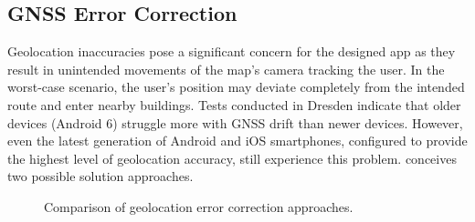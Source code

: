 \subsection{GNSS Error Correction}

Geolocation inaccuracies pose a significant concern for the designed app as they result in unintended movements of the map's camera tracking the user. In the worst-case scenario, the user's position may deviate completely from the intended route and enter nearby buildings. Tests conducted in Dresden indicate that older devices (Android 6) struggle more with GNSS drift than newer devices. However, even the latest generation of Android and iOS smartphones, configured to provide the highest level of geolocation accuracy, still experience this problem.  conceives two possible solution approaches.

\begin{figure}[htbp]
\centering
{}
\caption{Comparison of geolocation error correction approaches.}
\label{fig:battery-efficient-gps-error-correction}
\end{figure}

